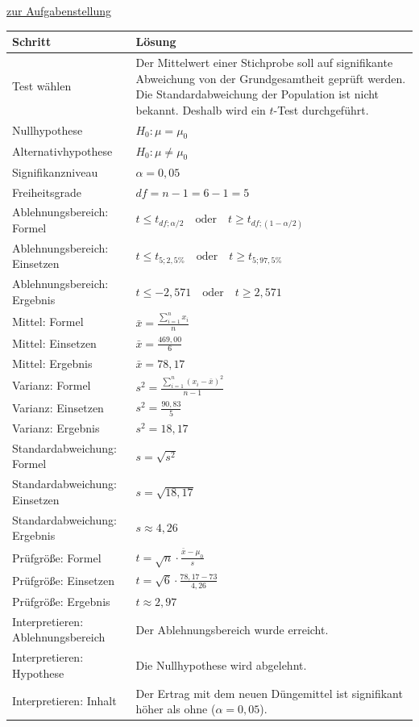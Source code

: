 \documentclass[
  11pt,
  ngerman,
  a4paper,
]{report}
\begin{document}
\protect\hyperlink{aufgabe-5-7}{zur Aufgabenstellung}

\begin{table}[H]
\centering
\begin{tabular}{ll}
\toprule
\textbf{Schritt} & \textbf{Lösung}\\
\midrule
Test wählen & Der Mittelwert einer Stichprobe soll auf signifikante Abweichung von der Grundgesamtheit geprüft werden. Die Standardabweichung der Population ist nicht bekannt. Deshalb wird ein $t$-Test durchgeführt.\\
Nullhypothese & $H_0: \mu = \mu_0$\\
Alternativhypothese & $H_0: \mu \neq \mu_0$\\
Signifikanzniveau & $\alpha = 0{,}05$\\
Freiheitsgrade & $\mathit{df} = n -1 = 6 - 1 = 5$\\
Ablehnungsbereich: Formel & $t \leq t_{\mathit{df};\alpha/2}\quad \textrm{oder} \quad t \geq t_{\mathit{df};(1-\alpha/2)}$\\
Ablehnungsbereich: Einsetzen & $t \leq t_{5; 2{,}5\%} \quad \textrm{oder} \quad t \geq t_{5; 97{,}5\%}$\\
Ablehnungsbereich: Ergebnis & $t \leq -2{,}571\quad \textrm{oder} \quad t \geq 2{,}571$\\
Mittel: Formel & $\bar{x}=\frac{\sum\limits_{i=1}^{n}x_{i}}{n}$\\
Mittel: Einsetzen & $\bar{x}=\frac{469{,}00}{6}$\\
Mittel: Ergebnis & $\bar{x}=78{,}17$\\
Varianz: Formel & $s^2=\frac{\sum\limits_{i=1}^{n}(x_{i}-\bar{x})^2}{n-1}$\\
Varianz: Einsetzen & $s^2=\frac{90{,}83}{5}$\\
Varianz: Ergebnis & $s^2=18{,}17$\\
Standardabweichung: Formel & $s=\sqrt{s^2}$\\
Standardabweichung: Einsetzen & $s=\sqrt{18{,}17}$\\
Standardabweichung: Ergebnis & $s\approx4{,}26$\\
Prüfgröße: Formel & $t=\sqrt{n}\cdot\frac{\bar{x}-\mu_0}{s}$\\
Prüfgröße: Einsetzen & $t=\sqrt{6}\cdot\frac{78{,}17-73}{4{,}26}$\\
Prüfgröße: Ergebnis & $t\approx2{,}97$\\
Interpretieren: Ablehnungsbereich & Der Ablehnungsbereich wurde erreicht.\\
Interpretieren: Hypothese & Die Nullhypothese wird abgelehnt.\\
Interpretieren: Inhalt & Der Ertrag mit dem neuen Düngemittel ist signifikant höher als ohne ($\alpha=0{,}05$).\\
\bottomrule
\end{tabular}
\end{table}
\end{document}
